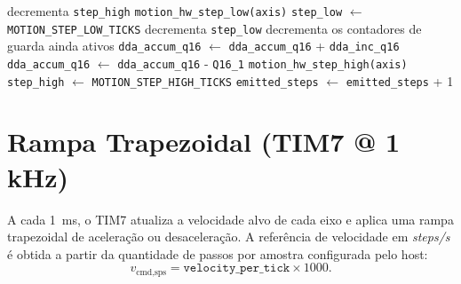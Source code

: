 \begin{algorithm}[H]
    \caption{Atualiza\c{c}\~ao do DDA Q16.16 no TIM6 (por eixo).}
    \label{alg:dda-tick}
    \begin{algorithmic}[1]
                \State decrementa \texttt{step\_high}
                    \State \texttt{motion\_hw\_step\_low(axis)}
                    \State \texttt{step\_low} $\gets$ \texttt{MOTION\_STEP\_LOW\_TICKS}
                \EndIf
                \State \Return
            \EndIf
                \State decrementa \texttt{step\_low}
                \State \Return
            \EndIf
                \State \Return
            \EndIf
                \State decrementa os contadores de guarda ainda ativos
                \State \Return
            \EndIf
            \State \texttt{dda\_accum\_q16} $\gets$ \texttt{dda\_accum\_q16} + \texttt{dda\_inc\_q16}
                \State \texttt{dda\_accum\_q16} $\gets$ \texttt{dda\_accum\_q16} - \texttt{Q16\_1}
                \State \texttt{motion\_hw\_step\_high(axis)}
                \State \texttt{step\_high} $\gets$ \texttt{MOTION\_STEP\_HIGH\_TICKS}
                \State \texttt{emitted\_steps} $\gets$ \texttt{emitted\_steps} + 1
            \EndIf
        \EndProcedure
    \end{algorithmic}
\end{algorithm}

\section{Rampa Trapezoidal (TIM7 @ 1 kHz)}
\label{sec:rampa_trapezoidal}

A cada \SI{1}{\milli\second}, o TIM7 atualiza a velocidade alvo de cada
eixo e aplica uma rampa trapezoidal de acelera\c{c}\~ao ou
desacelera\c{c}\~ao. A refer\^encia de velocidade em \emph{steps/s} \'e
obtida a partir da quantidade de passos por amostra configurada pelo
host:
\begin{equation}
    v_{\text{cmd,sps}} = \texttt{velocity\_per\_tick} \times 1000.
\end{equation}

